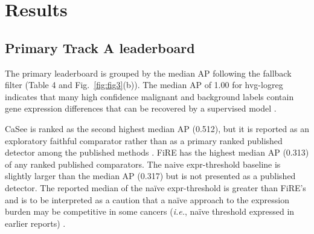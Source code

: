 \documentclass[10pt]{article}
\begin{document}
\section{Results}

\subsection{Primary Track A leaderboard}

The primary leaderboard is grouped by the median AP following the fallback filter (Table 4 and Fig.~\ref{fig:fig3}(b)). The median AP of 1.00 for hvg-logreg indicates that many high confidence malignant and background labels contain gene expression differences that can be recovered by a supervised model \cite{stegle2015computational,ren2018understanding}.

CaSee is ranked as the second highest median AP (0.512), but it is reported as an exploratory faithful comparator rather than as a primary ranked published detector among the published methods \cite{sh2022casee}. FiRE has the highest median AP (0.313) of any ranked published comparators. The naive expr-threshold baseline is slightly larger than the median AP (0.317) but is not presented as a published detector. The reported median of the naïve expr-threshold is greater than FiRE's and is to be interpreted as a caution that a naïve approach to the expression burden may be competitive in some cancers (\textit{i.e.}, naïve threshold expressed in earlier reports) \cite{torre2018rare}.
\end{document}
